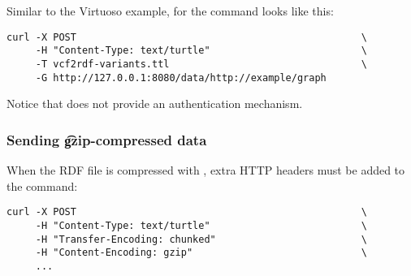 Similar to the Virtuoso example, for  the command looks like
this:

\begin{lstlisting}
curl -X POST                                                 \
     -H "Content-Type: text/turtle"                          \
     -T vcf2rdf-variants.ttl                                 \
     -G http://127.0.0.1:8080/data/http://example/graph
\end{lstlisting}

Notice that \program{4store} does not provide an authentication mechanism.

\subsubsection{Sending \t{gzip}-compressed data}

  When the RDF file is compressed with , extra HTTP headers must
  be added to the \program{curl} command:

\begin{lstlisting}
curl -X POST                                                 \
     -H "Content-Type: text/turtle"                          \
     -H "Transfer-Encoding: chunked"                         \
     -H "Content-Encoding: gzip"                             \
     ...
\end{lstlisting}
